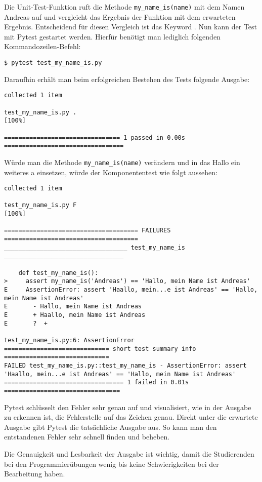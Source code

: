 Die Unit-Test-Funktion  ruft die Methode
\texttt{my\_name\_is(name)} mit dem Namen \glqq Andreas\grqq{} auf und
vergleicht das Ergebnis der Funktion mit dem erwarteten Ergebnis. Entscheidend
für diesen Vergleich ist das Keyword . Nun kann der Test mit
Pytest gestartet werden. Hierfür benötigt man lediglich folgenden
Kommandozeilen-Befehl:

\begin{lstlisting}[style=Bash]
    $ pytest test_my_name_is.py
\end{lstlisting}

Daraufhin erhält man beim erfolgreichen Bestehen des Tests folgende Ausgabe:

\begin{lstlisting}[style=Bash]
collected 1 item                                                               

test_my_name_is.py .                                                                  [100%]

================================ 1 passed in 0.00s =================================
\end{lstlisting}

Würde man die Methode \texttt{my\_name\_is(name)} verändern und in das
\glqq Hallo\grqq{} ein weiteres \glqq a\grqq{} einsetzen, würde der
Komponententest wie folgt aussehen:

\begin{lstlisting}[style=Bash]
collected 1 item                                                                                                                      

test_my_name_is.py F                                                                  [100%]

===================================== FAILURES =====================================
__________________________________ test_my_name_is _________________________________

    def test_my_name_is():
>     assert my_name_is('Andreas') == 'Hallo, mein Name ist Andreas'
E     AssertionError: assert 'Haallo, mein...e ist Andreas' == 'Hallo, mein Name ist Andreas'
E       - Hallo, mein Name ist Andreas
E       + Haallo, mein Name ist Andreas
E       ?  +

test_my_name_is.py:6: AssertionError
============================= short test summary info =============================
FAILED test_my_name_is.py::test_my_name_is - AssertionError: assert 'Haallo, mein...e ist Andreas' == 'Hallo, mein Name ist Andreas'
================================= 1 failed in 0.01s ================================
\end{lstlisting}

Pytest schlüsselt den Fehler sehr genau auf und visualisiert, wie in der Ausgabe
zu erkennen ist, die Fehlerstelle auf das Zeichen genau. Direkt unter die
erwartete Ausgabe gibt Pytest die tatsächliche Ausgabe aus. So kann man den
entstandenen Fehler sehr schnell finden und beheben.

Die Genauigkeit und Lesbarkeit der Ausgabe ist wichtig, damit die Studierenden
bei den Programmierübungen wenig bis keine Schwierigkeiten bei der Bearbeitung
haben.